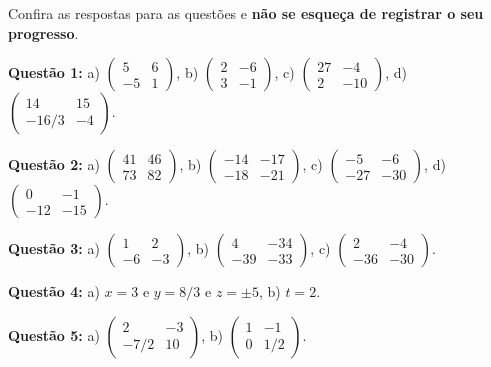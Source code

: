 \documentclass[main_estudante.tex]{subfiles}
\begin{document}
Confira as respostas para as questões e \textbf{não se esqueça de registrar o seu progresso}.

\noindent\textbf{Questão 1:} a) $\begin{pmatrix} 5 & 6 \\ -5 & 1\end{pmatrix}$, b) $\begin{pmatrix} 2 & -6 \\ 3 & -1\end{pmatrix}$, c) $\begin{pmatrix} 27 & -4 \\ 2 & -10\end{pmatrix}$, d) $\begin{pmatrix} 14 & 15 \\ -16/3 & -4\end{pmatrix}$.

\noindent\textbf{Questão 2:} a) $\begin{pmatrix} 41 & 46 \\ 73 & 82\end{pmatrix}$, b) $\begin{pmatrix} -14 & -17 \\ -18 & -21\end{pmatrix}$, c) $\begin{pmatrix} -5 & -6 \\ -27 & -30\end{pmatrix}$, d) $\begin{pmatrix} 0 & -1 \\ -12 & -15\end{pmatrix}$.

\noindent\textbf{Questão 3:} a) $\begin{pmatrix} 1 & 2 \\ -6 & -3\end{pmatrix}$, b) $\begin{pmatrix} 4 & -34 \\ -39 & -33\end{pmatrix}$, c) $\begin{pmatrix} 2 & -4 \\ -36 & -30\end{pmatrix}$.

\noindent\textbf{Questão 4:} a) $x=3$ e $y=8/3$ e $z= \pm 5$, b) $t=2$.

\noindent\textbf{Questão 5:} a) $\begin{pmatrix} 2 & -3 \\ -7/2 & 10\end{pmatrix}$, b) $\begin{pmatrix} 1 & -1 \\ 0 & 1/2\end{pmatrix}$.
\end{document}
